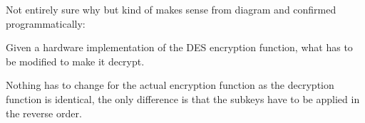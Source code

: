 \documentclass{supervision}
\begin{document}
\begin{questions}
\begin{solution}
        Not entirely sure why but kind of makes sense from diagram and
        confirmed programmatically:

      \end{solution}

    \question Given a hardware implementation of the DES encryption function,
      what has to be modified to make it decrypt.

      \begin{solution}
        Nothing has to change for the actual encryption function as the
        decryption function is identical, the only difference is that the
        subkeys have to be applied in the reverse order.
      \end{solution}

  \end{questions}
\end{document}
